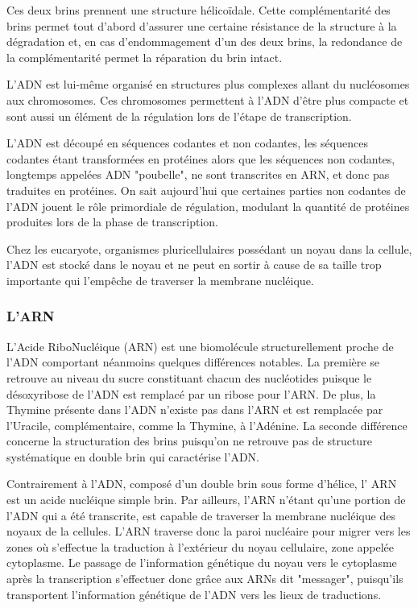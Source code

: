 
Ces deux brins prennent une structure hélicoïdale. Cette complémentarité des brins permet tout d'abord d'assurer une certaine résistance de la structure à la dégradation et, en cas d'endommagement d'un des deux brins, la redondance de la complémentarité permet la réparation du brin intact. 

L'ADN est lui-même organisé en structures plus complexes allant du nucléosomes aux chromosomes. Ces chromosomes permettent à l'ADN d'être plus compacte et sont aussi un élément de la 
régulation lors de l'étape de transcription. 


L'ADN est découpé en séquences codantes et non codantes, les séquences codantes étant transformées en protéines alors que les séquences non codantes, longtemps appelées ADN "poubelle", ne sont transcrites en ARN, et donc pas traduites en protéines. On sait aujourd'hui que certaines parties non codantes de l'ADN jouent le rôle primordiale de régulation, modulant la quantité de protéines produites lors de la phase de transcription.

Chez les eucaryote, organismes pluricellulaires possédant un noyau dans la cellule, l'ADN est stocké dans le noyau et ne peut en sortir à cause de sa taille trop importante qui l'empêche de traverser la membrane nucléique. 


\subsubsection{L'ARN}

L'Acide RiboNucléique (ARN) est une biomolécule structurellement proche de l'ADN comportant néanmoins quelques différences notables. La première se retrouve au niveau du sucre constituant chacun des nucléotides puisque le désoxyribose de l'ADN est remplacé par un ribose pour l'ARN. De plus, la Thymine présente dans l'ADN n'existe pas dans l'ARN et est remplacée par l'Uracile, complémentaire, comme la Thymine, à l'Adénine. La seconde différence concerne la structuration des brins puisqu'on ne retrouve pas de structure systématique en double brin qui caractérise l'ADN. 


Contrairement à l'ADN, composé d'un double brin sous forme d'hélice, l' ARN est un acide nucléique simple brin. Par ailleurs, l'ARN n'étant qu'une portion de l'ADN qui a été transcrite, est capable de traverser la membrane nucléique des noyaux de la cellules. L'ARN traverse donc la paroi nucléaire pour migrer vers les zones où s'effectue la traduction à l'extérieur du noyau cellulaire, zone appelée cytoplasme. Le passage de l'information génétique du noyau vers le cytoplasme après la transcription s'effectuer donc grâce aux ARNs dit "messager", puisqu'ils transportent l'information génétique de l'ADN vers les lieux de traductions. 

